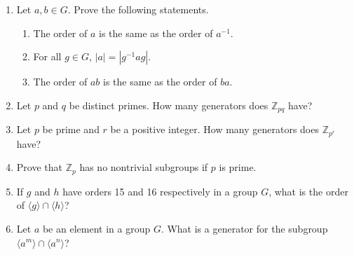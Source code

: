 {\begin{enumerate}
\begin{minipage}[t]{4.6in}
\begin{minipage}[t]{2.25in}
\begin{itemize}
\end{itemize}
\end{minipage} \hfill
\begin{minipage}[t]{2.25in}
\begin{itemize}
 
 \item[{\bf (b)}]
$2557^{ 341} \pmod{ 5681}$
 
 \item[{\bf (d)}]
$971^{ 321} \pmod{ 765}$
 
\end{itemize}
\end{minipage}
\end{minipage}
 
\vspace{2pt}        %
 
 
 
\bf\item\rm
Let $a, b \in G$.  Prove the following statements.
\begin{enumerate}
 
 \bf\item\rm
The order of $a$ is the same as the order of $a^{-1}$.
 
 \bf\item\rm
For all $g \in G$, $|a| = |g^{-1}ag|$.
 
 \bf\item\rm
The order of $ab$ is the same as the order of $ba$.
 
\end{enumerate}
 
 
\bf\item\rm
Let $p$ and $q$ be distinct primes.  How many generators does ${\mathbb
Z}_{pq}$ have? 
 
 
\bf\item\rm
Let $p$ be prime and $r$ be a positive integer.  How many generators
does ${\mathbb Z}_{p^r}$ have? 
 
 
\bf\item\rm
Prove that  ${\mathbb Z}_{p}$ has no nontrivial subgroups if $p$ is
prime. 
 
 
\bf\item\rm
If $g$ and $h$ have orders 15 and 16 respectively in a group $G$, what
is the order of $\langle g \rangle  \cap \langle h \rangle $? 
 
 
\bf\item\rm
Let $a$ be an element in a group $G$. What is a generator for the
subgroup $\langle a^m \rangle  \cap  \langle a^n \rangle $?
 

\end{enumerate}}

